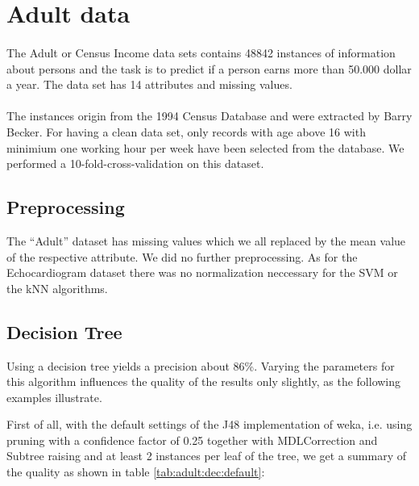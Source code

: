 \documentclass[paper=a4, fontsize=11pt]{scrartcl} %
\numberwithin{equation}{section} %
\numberwithin{figure}{section} %
\numberwithin{table}{section} %
\begin{document}





\section{Adult data}

\paragraph{}The Adult or Census Income data sets contains 48842 instances of information about persons and the task is to predict if a person earns more than 50.000 dollar a year. The data set has 14 attributes and missing values.

\paragraph{}The instances origin from the 1994 Census Database and were extracted by Barry Becker. For having a clean data set, only records with age above 16 with minimium one working hour per week have been selected from the database. We performed a 10-fold-cross-validation on this dataset.

\subsection{Preprocessing}

The ``Adult'' dataset has missing values which we all replaced by the mean value of the respective attribute. We did no further preprocessing. As for the Echocardiogram dataset there was no normalization neccessary for the SVM or the kNN algorithms.


\subsection{Decision Tree}
Using a decision tree yields a precision about 86\%. Varying the parameters for this algorithm influences the quality of the results only slightly, as the following examples illustrate.

First of all, with the default settings of the J48 implementation of weka, i.e. using pruning with a confidence factor of 0.25 together with MDLCorrection and Subtree raising and at least 2 instances per leaf of the tree, we get a summary of the quality as shown in table \ref{tab:adult:dec:default}:
 
\end{document}
